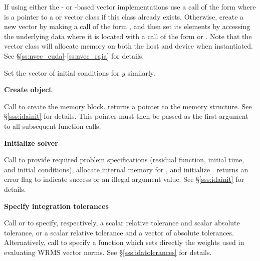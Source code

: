 \begin{Steps}
  If using either the {\cuda}- or {\raja}-based vector implementations
  use a call of the form
   where  is a pointer to a 
  or  vector class if this class already exists.  Otherwise,
  create a new vector
  by making a call of the form , and then set its
  elements by accessing the underlying data where it is located
  with a call of the form
   or .
  Note that the vector class will allocate memory on both the host and device
  when instantiated.  See \S\ref{ss:nvec_cuda}-\ref{ss:nvec_raja} for details.


  Set the vector  of initial conditions for $\dot{y}$ similarly.

\item\label{i:ida_create}
  {\bf Create {\ida} object}

  Call \id{()}
  to create the {\ida} memory block.
   returns a pointer to the {\ida} memory structure.
  See \S\ref{sss:idainit} for details.
  This  pointer must then be passed as the first argument
  to all subsequent {\ida} function calls.

\item\label{i:ida_init}
  {\bf Initialize {\ida} solver}

  Call  to provide required problem
  specifications (residual function, initial time, and initial conditions),
  allocate internal memory for {\ida}, and initialize {\ida}.
   returns an error flag to indicate success or an illegal argument
  value.  See \S\ref{sss:idainit} for details.

\item
  {\bf Specify integration tolerances}

  Call  or 
  to specify, respectively, a scalar relative tolerance and scalar
  absolute tolerance, or a scalar relative tolerance and a vector of
  absolute tolerances.  Alternatively, call  to
  specify a function which sets directly the weights used in
  evaluating WRMS vector norms.  See \S\ref{sss:idatolerances} for
  details.


\end{Steps}
